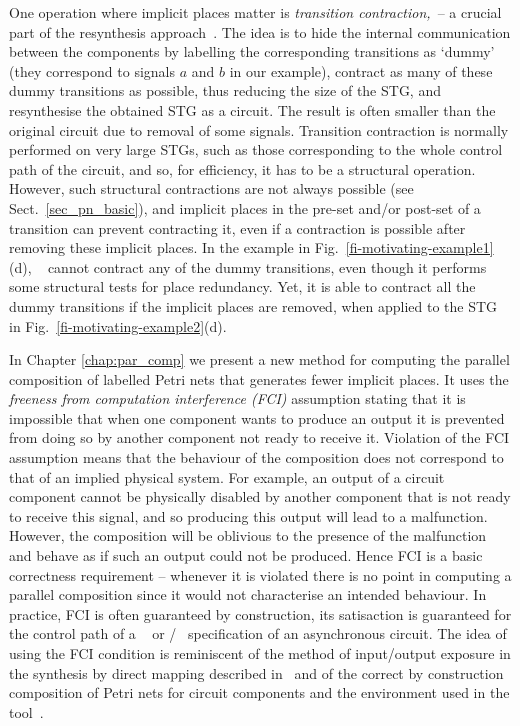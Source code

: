 One operation where implicit places matter is \emph{transition contraction,}~\cite{vowo02lncs}-- a crucial part of the resynthesis approach~\cite{CN-02,KVL-96,PC-96}. The idea is to hide the internal communication between the components by labelling the corresponding transitions as `dummy' (they correspond to signals $a$ and $b$ in our example), contract as many of these dummy transitions as possible, thus reducing the size of the STG, and resynthesise the obtained STG as a circuit. The result is often smaller than the original circuit due to removal of some signals. Transition contraction is normally performed on very large STGs, such as those corresponding to the whole control path of the circuit, and so, for efficiency, it has to be a structural operation. However, such structural contractions are not always possible (see Sect.~\ref{sec_pn_basic}), and implicit places in the pre-set and/or post-set of a transition can prevent contracting it, even if a contraction is possible after removing these implicit places. In the example in Fig.~\ref{fi-motivating-example1}(d), \desij~\cite{DesiJ} cannot contract any of the dummy transitions, even though it performs some structural tests for place redundancy. Yet, it is able to contract all the dummy transitions if the implicit places are removed, \ie when applied to the STG in Fig.~\ref{fi-motivating-example2}(d).

In Chapter \ref{chap:par_comp} we present a new method for computing the parallel composition of labelled Petri nets that generates fewer implicit places. It uses the \emph{freeness from computation interference (FCI)} assumption \cite{FCI} stating that it is impossible that when one component wants to produce an output it is prevented from doing so by another component not ready to receive it. Violation of the FCI assumption means that the behaviour of the composition does not correspond to that of an implied physical system. For example, an output of a circuit component cannot be physically disabled by another component that is not ready to receive this signal, and so producing this output will lead to a malfunction. However, the composition will be oblivious to the presence of the malfunction and behave as if such an output could not be produced.
Hence FCI is a basic correctness requirement -- whenever it is violated there is no point in computing a parallel composition since it would not characterise an intended behaviour. In practice, FCI is often guaranteed by construction, \eg its satisaction is guaranteed for the control path of a \balsa~\cite{EB-02} or \haste/\tangram~\cite{berkel91,haste-manual} specification of an asynchronous circuit. The idea of using the FCI condition is reminiscent of the method of input/output exposure in the synthesis by direct mapping described in~\cite{SBY-07} and of the correct by construction composition of Petri nets for circuit components and the environment used in the \ditopn tool~\cite{JF-00}.

